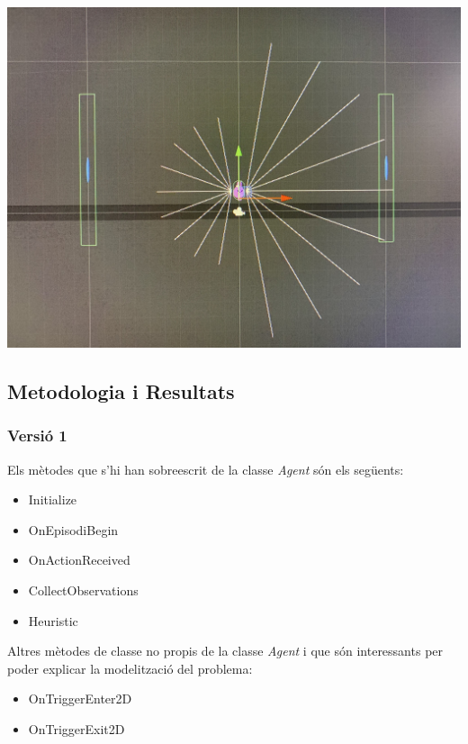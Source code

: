 \documentclass{article}
\begin{document}
    \includegraphics[width=1\textwidth]{images/v2/arq-v2.jpg}

   
   \newpage
    
    \subsection{Metodologia i Resultats}
    
    \subsubsection{Versió 1}
    
    
     Els mètodes que s'hi han sobreescrit de la classe \textit{Agent} són els següents:
    
    \begin{itemize}
        \item Initialize
        \item OnEpisodiBegin
        \item OnActionReceived
        \item CollectObservations
        \item Heuristic
    \end{itemize}
    
    Altres mètodes de classe no propis de la classe \textit{Agent} i que són interessants per poder explicar la modelització del problema:
    
    \begin{itemize}
        \item OnTriggerEnter2D
        \item OnTriggerExit2D
    \end{itemize}
    
\end{document}
